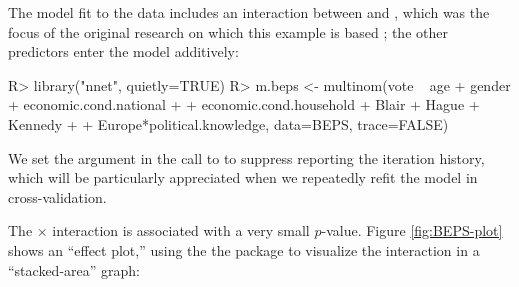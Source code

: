 \documentclass[
]{jss}
\begin{document}
The model fit to the data includes an interaction between 
and , which was the focus of the original
research on which this example is based
\citep{AndersenHeathSinnott:2002}; the other predictors enter the model
additively:

\begin{CodeChunk}
\begin{CodeInput}
R> library("nnet", quietly=TRUE)
R> m.beps <- multinom(vote ~ age + gender + economic.cond.national +
+                        economic.cond.household + Blair + Hague + Kennedy +
+                        Europe*political.knowledge, data=BEPS, trace=FALSE)
\end{CodeInput}
\end{CodeChunk}

We set the argument  in the call to 
to suppress reporting the iteration history, which will be particularly
appreciated when we repeatedly refit the model in cross-validation.

The  \(\times\)  interaction is
associated with a very small \(p\)-value. Figure \ref{fig:BEPS-plot}
shows an ``effect plot,'' using the the  package
\citep{FoxWeisberg:2019} to visualize the interaction in a
``stacked-area'' graph:
\end{document}
